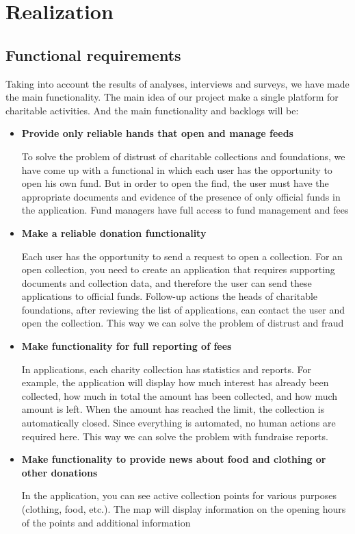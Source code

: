 \chapter{Realization}\label{ch:B}

\section{Functional requirements}
 
Taking into account the results of analyses, interviews and surveys, we have made the main functionality. The main idea of our project make a single platform for charitable activities. And the main functionality and backlogs will be:
\begin{itemize}
    \item \textbf{Provide only reliable hands that open and manage feeds} 
    
        To solve the problem of distrust of charitable collections and foundations, we have come up with a functional in which each user has the opportunity to open his own fund. But in order to open the find, the user must have the appropriate documents and evidence of the presence of only official funds in the application. Fund managers have full access to fund management and fees
    
    \item \textbf{Make a reliable donation functionality}
    
        Each user has the opportunity to send a request to open a collection. For an open collection, you need to create an application that requires supporting documents and collection data, and therefore the user can send these applications to official funds. Follow-up actions the heads of charitable foundations, after reviewing the list of applications, can contact the user and open the collection. This way we can solve the problem of distrust and fraud
        
    \item \textbf{Make functionality for full reporting of fees}
    
        In applications, each charity collection has statistics and reports. For example, the application will display how much interest has already been collected, how much in total the amount has been collected, and how much amount is left. When the amount has reached the limit, the collection is automatically closed. Since everything is automated, no human actions are required here. This way we can solve the problem with fundraise reports.
        
    \item \textbf{Make functionality to provide news about food and clothing or other donations} 
    
        In the application, you can see active collection points for various purposes (clothing, food, etc.). The map will display information on the opening hours of the points and additional information
        
        
        
        
\end{itemize}

